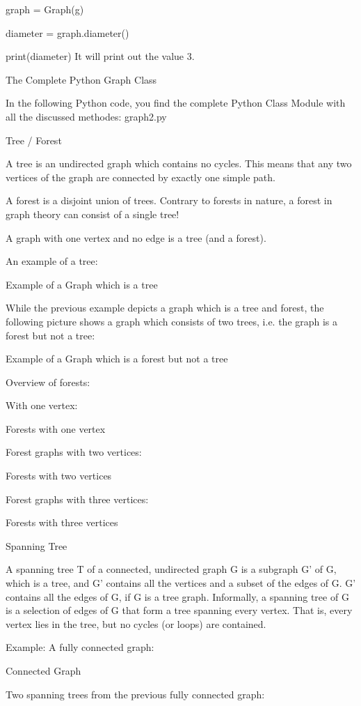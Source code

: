 graph = Graph(g)

diameter = graph.diameter()

print(diameter)
It will print out the value 3. 

The Complete Python Graph Class

In the following Python code, you find the complete Python Class Module with all the discussed methodes: graph2.py 

Tree / Forest

A tree is an undirected graph which contains no cycles. This means that any two vertices of the graph are connected by exactly one simple path. 

A forest is a disjoint union of trees. Contrary to forests in nature, a forest in graph theory can consist of a single tree! 

A graph with one vertex and no edge is a tree (and a forest). 

An example of a tree: 

Example of a Graph which is a tree 

While the previous example depicts a graph which is a tree and forest, the following picture shows a graph which consists of two trees, i.e. the graph is a forest but not a tree: 

Example of a Graph which is a forest but not a tree 

Overview of forests:

With one vertex: 

Forests with one vertex 

Forest graphs with two vertices: 

Forests with two vertices 

Forest graphs with three vertices: 

Forests with three vertices 

Spanning Tree

A spanning tree T of a connected, undirected graph G is a subgraph G' of G, which is a tree, and G' contains all the vertices and a subset of the edges of G. G' contains all the edges of G, if G is a tree graph. Informally, a spanning tree of G is a selection of edges of G that form a tree spanning every vertex. That is, every vertex lies in the tree, but no cycles (or loops) are contained. 

Example: 
A fully connected graph: 

Connected Graph 

Two spanning trees from the previous fully connected graph: 

